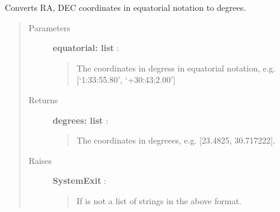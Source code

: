 \documentclass[a4paper,10pt,english]{sphinxmanual}
\begin{document}

\begin{fulllineitems}
\label{functions:astrolyze.functions.astro_functions.equatorial_to_degrees}
Converts RA, DEC coordinates in equatorial notation to degrees.
\begin{quote}\begin{description}
\item[{Parameters }] \leavevmode
\textbf{equatorial: list} :
\begin{quote}

The coordinates in degress in equatorial notation, e.g.
{[}`1:33:55.80', `+30:43:2.00'{]}
\end{quote}

\item[{Returns }] \leavevmode
\textbf{degrees: list} :
\begin{quote}

The coordinates in degreees, e.g. {[}23.4825, 30.717222{]}.
\end{quote}

\item[{Raises }] \leavevmode
\textbf{SystemExit} :
\begin{quote}

If  is not a list of strings in the above format.
\end{quote}

\end{description}\end{quote}

\end{fulllineitems}

\end{document}
